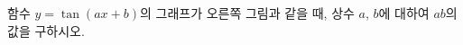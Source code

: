 \noindent\begin{minipage}[t]{0.58\linewidth}\vspace{0pt}\raggedright 함수 $y=\tan(ax+b)$의 그래프가 오른쪽 그림과 같을 때, 상수 $a$, $b$에 대하여 $ab$의 값을 구하시오. \end{minipage}\hfill\begin{minipage}[t]{0.4\linewidth}\vspace{0pt}\centering \resizebox{\ifdim\width>\linewidth\linewidth\else\width\fi}{!}{}\end{minipage}\par
